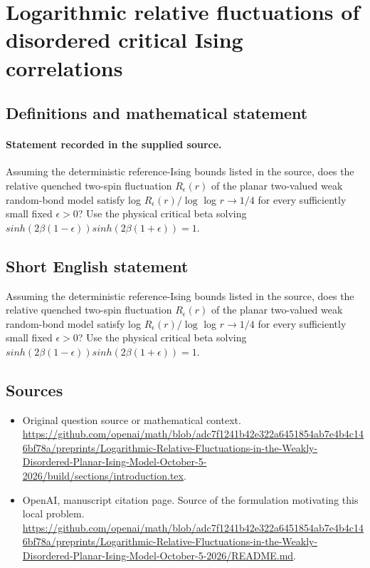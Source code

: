 \documentclass[11pt]{article}
\begin{document}
\section*{Logarithmic relative fluctuations of disordered critical Ising correlations}\label{30007412}
\subsection{Definitions and mathematical statement}
\paragraph{Statement recorded in the supplied source.}
Assuming the deterministic reference-Ising bounds listed in the source, does the relative quenched two-spin fluctuation $R_\epsilon (r)$ of the planar two-valued weak random-bond model satisfy log $R_\epsilon (r)/\log $ log $r\to 1/4$ for every sufficiently small fixed $\epsilon >0$? Use the physical critical beta solving $sinh(2\beta (1-\epsilon ))sinh(2\beta (1+\epsilon ))=1$.
\subsection{Short English statement}
Assuming the deterministic reference-Ising bounds listed in the source, does the relative quenched two-spin fluctuation $R_\epsilon (r)$ of the planar two-valued weak random-bond model satisfy log $R_\epsilon (r)/\log $ log $r\to 1/4$ for every sufficiently small fixed $\epsilon >0$? Use the physical critical beta solving $sinh(2\beta (1-\epsilon ))sinh(2\beta (1+\epsilon ))=1$.
\subsection{Sources}
\begin{itemize}
\item[S1] Original question source or mathematical context.
\url{https://github.com/openai/math/blob/adc7f1241b42e322a6451854ab7e4b4c146bf78a/preprints/Logarithmic-Relative-Fluctuations-in-the-Weakly-Disordered-Planar-Ising-Model-October-5-2026/build/sections/introduction.tex}.
\item[S2] OpenAI, manuscript citation page. Source of the formulation motivating this local problem.
\url{https://github.com/openai/math/blob/adc7f1241b42e322a6451854ab7e4b4c146bf78a/preprints/Logarithmic-Relative-Fluctuations-in-the-Weakly-Disordered-Planar-Ising-Model-October-5-2026/README.md}.
\end{itemize}
\end{document}
